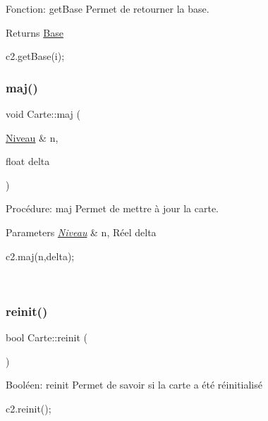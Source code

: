 Fonction\+: get\+Base Permet de retourner la base. 

\begin{DoxyReturn}{Returns}
\hyperlink{classBase}{Base} 
\begin{DoxyCode}
c2.getBase(i);
\end{DoxyCode}
 
\end{DoxyReturn}
\mbox{\label{classCarte_a6d721dfc81b3a45f038c73d20e80d545}} 
\subsubsection{\texorpdfstring{maj()}{maj()}}
{\footnotesize\ttfamily void Carte\+::maj (\begin{DoxyParamCaption}\item[{\hyperlink{classNiveau}{Niveau} \&}]{n,  }\item[{float}]{delta }\end{DoxyParamCaption})}



Procédure\+: maj Permet de mettre à jour la carte. 


\begin{DoxyParams}{Parameters}
{\em \hyperlink{classNiveau}{Niveau}} & n, Réel delta 
\begin{DoxyCode}
c2.maj(n,delta);
\end{DoxyCode}
 \\
\hline
\end{DoxyParams}
\mbox{\label{classCarte_a80741d7228490a91565f33977355da92}} 
\subsubsection{\texorpdfstring{reinit()}{reinit()}}
{\footnotesize\ttfamily bool Carte\+::reinit (\begin{DoxyParamCaption}{ }\end{DoxyParamCaption})}



Booléen\+: reinit Permet de savoir si la carte a été réinitialisé 


\begin{DoxyCode}
c2.reinit();
\end{DoxyCode}
 \mbox{\label{classCarte_a66c41e01a4a8730630bd77b6dd1b670e}} 
